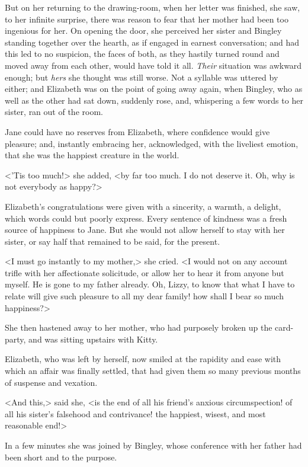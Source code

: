 But on her returning to the drawing-room, when her letter was finished, she saw, to her infinite surprise, there was reason to fear that her mother had been too ingenious for her. On opening the door, she perceived her sister and Bingley standing together over the hearth, as if engaged in earnest conversation; and had this led to no suspicion, the faces of both, as they hastily turned round and moved away from each other, would have told it all. \textit{Their} situation was awkward enough; but \textit{hers} she thought was still worse. Not a syllable was uttered by either; and Elizabeth was on the point of going away again, when Bingley, who as well as the other had sat down, suddenly rose, and, whispering a few words to her sister, ran out of the room.

Jane could have no reserves from Elizabeth, where confidence would give pleasure; and, instantly embracing her, acknowledged, with the liveliest emotion, that she was the happiest creature in the world.

<'Tis too much!> she added, <by far too much. I do not deserve it. Oh, why is not everybody as happy?>

Elizabeth's congratulations were given with a sincerity, a warmth, a delight, which words could but poorly express. Every sentence of kindness was a fresh source of happiness to Jane. But she would not allow herself to stay with her sister, or say half that remained to be said, for the present.

<I must go instantly to my mother,> she cried. <I would not on any account trifle with her affectionate solicitude, or allow her to hear it from anyone but myself. He is gone to my father already. Oh, Lizzy, to know that what I have to relate will give such pleasure to all my dear family! how shall I bear so much happiness?>

She then hastened away to her mother, who had purposely broken up the card-party, and was sitting upstairs with Kitty.

Elizabeth, who was left by herself, now smiled at the rapidity and ease with which an affair was finally settled, that had given them so many previous months of suspense and vexation.

<And this,> said she, <is the end of all his friend's anxious circumspection! of all his sister's falsehood and contrivance! the happiest, wisest, and most reasonable end!>

In a few minutes she was joined by Bingley, whose conference with her father had been short and to the purpose.

